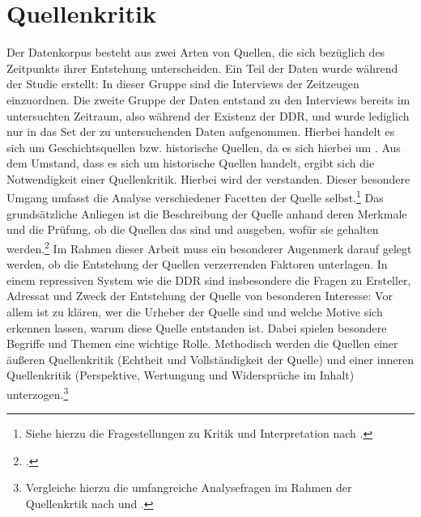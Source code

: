 \section{Quellenkritik}
Der Datenkorpus besteht aus zwei Arten von Quellen, die sich bezüglich des Zeitpunkts ihrer Entstehung unterscheiden.
Ein Teil der Daten wurde während der Studie erstellt:
In dieser Gruppe sind die Interviews der Zeitzeugen einzuordnen.
Die zweite Gruppe der Daten entstand zu den Interviews bereits im untersuchten Zeitraum, also während der Existenz der DDR, und wurde lediglich nur in das Set der zu untersuchenden Daten aufgenommen.
Hierbei handelt es sich um Geschichtsquellen bzw. historische Quellen, da es sich hierbei um \autocite[29]{Kirn1959}.
Aus dem Umstand, dass es sich um historische Quellen handelt, ergibt sich die Notwendigkeit einer Quellenkritik.\autocite[78]{Eckert2019} 
Hierbei wird der \autocite[45]{Jordan2018} verstanden.
Dieser besondere Umgang umfasst die Analyse verschiedener Facetten der Quelle selbst.\footnote{Siehe hierzu die Fragestellungen zu Kritik und Interpretation nach \textcite[162]{Borowsky1989}.}
Das grundsätzliche Anliegen ist die Beschreibung der Quelle anhand deren Merkmale und die Prüfung, ob die Quellen das sind und ausgeben, wofür sie gehalten werden.\footcite[114]{Bernheim1907}
Im Rahmen dieser Arbeit muss ein besonderer Augenmerk darauf gelegt werden, ob die Entstehung der Quellen verzerrenden Faktoren unterlagen.
In einem repressiven System wie die DDR sind insbesondere die Fragen zu Ersteller, Adressat und Zweck der Entstehung der Quelle von besonderen Interesse: 
Vor allem ist zu klären, wer die Urheber der Quelle sind und welche Motive sich erkennen lassen, warum diese Quelle entstanden ist.
Dabei spielen besondere Begriffe und Themen eine wichtige Rolle.
Methodisch werden die Quellen einer äußeren Quellenkritik (Echtheit und Vollständigkeit der Quelle)\autocite[67]{Budde2008} und einer inneren Quellenkritik (Perspektive, Wertungung und Widersprüche im Inhalt)\autocite[67]{Budde2008} unterzogen.\footnote{Vergleiche hierzu die umfangreiche Analysefragen im Rahmen der Quellenkrtik nach \textcite[78\psq]{Eckert2019} und \textcite[67]{Budde2008} .} 


